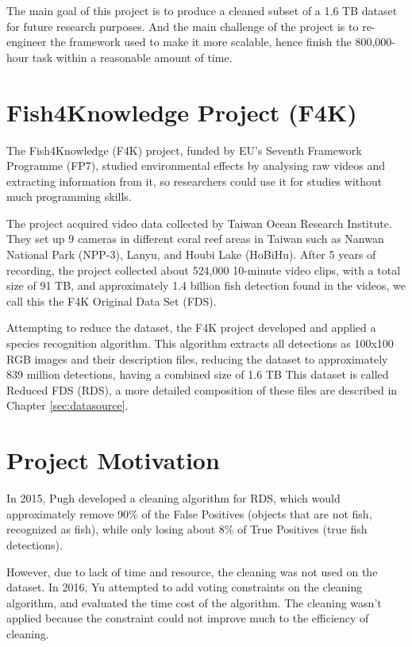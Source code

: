 \documentclass[bsc,logo,twoside,fullspacing,parskip]{infthesis}
\begin{document}

The main goal of this project is to produce a cleaned subset of a 1.6 TB dataset for future research purposes. And the main challenge of the project is to re-engineer the framework used to make it more scalable, hence finish the 800,000-hour task within a reasonable amount of time.

\section{Fish4Knowledge Project (F4K)}

The Fish4Knowledge (F4K) project, funded by EU's Seventh Framework Programme (FP7), studied environmental effects by analysing raw videos and extracting information from it, so researchers could use it for studies without much programming skills. 

The project acquired video data collected by Taiwan Ocean Research Institute. 
They set up 9 cameras in different coral reef areas in Taiwan such as Nanwan National Park (NPP-3), Lanyu, and Houbi Lake (HoBiHu). 
After 5 years of recording, the project collected about 524,000 10-minute video clips, with a total size of 91 TB, and approximately 1.4 billion fish detection found in the videos, we call this the F4K Original Data Set (FDS).

Attempting to reduce the dataset, the F4K project developed and applied a species recognition algorithm. 
This algorithm extracts all detections as 100x100 RGB images and their description files, reducing the dataset to approximately 839 million detections, having a combined size of 1.6 TB
This dataset is called Reduced FDS (RDS), a more detailed composition of these files are described in Chapter \ref{sec:datasource}.

\section{Project Motivation}

In 2015, Pugh\cite{P1} developed a cleaning algorithm for RDS, which would approximately remove 90\% of the False Positives (objects that are not fish, recognized as fish), while only losing about 8\% of True Positives (true fish detections). 

However, due to lack of time and resource, the cleaning was not used on the dataset.
In 2016, Yu\cite{P3} attempted to add voting constraints on the cleaning algorithm, and evaluated the time cost of the algorithm.
The cleaning wasn't applied because the constraint could not improve much to the efficiency of cleaning.
\end{document}
